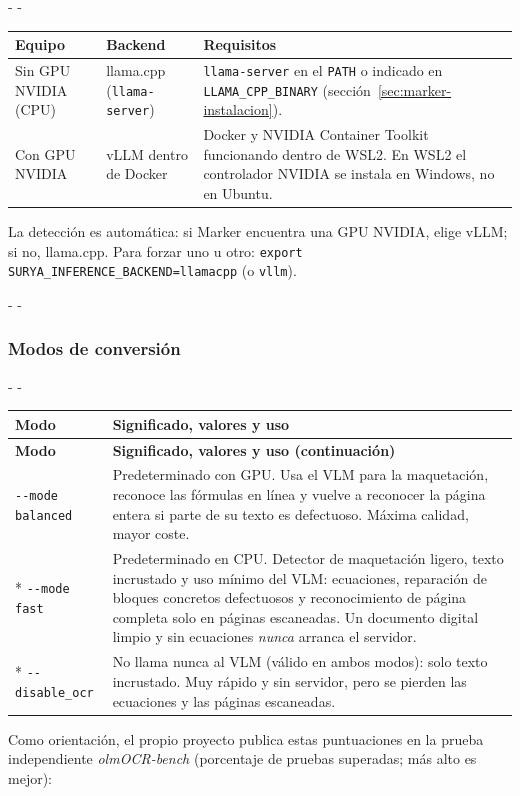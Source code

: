\documentclass[11pt,a4paper]{article}
\makeatletter
\newcommand{\necesitaespacio}[1]{\par\penalty-100\begingroup
	\setlength{\dimen@}{#1}\dimen@ii\pagegoal\advance\dimen@ii-\pagetotal
	\ifdim\dimen@>\dimen@ii\ifdim\dimen@ii>\z@\vfil\fi\penalty-\@M\fi\endgroup}
\newenvironment{opciones}[1][Opción]{%
	\par\begingroup\small
	\begin{longtable}{L{4.25cm}L{11.2cm}}
		\toprule\rowcolor{tablacab}\cab{#1} & \cab{Significado, valores y uso} \\ \midrule
		\endfirsthead
		\toprule\rowcolor{tablacab}\cab{#1} & \cab{Significado, valores y uso (continuación)} \\ \midrule
		\endhead
		\bottomrule
		\endfoot}
	{\end{longtable}\endgroup}
\newcommand{\cmd}[1]{\texttt{\textcolor{colcmd}{#1}}}      %
\newcommand{\opt}[1]{\texttt{\textcolor{colopt}{#1}}}      %
\newcommand{\val}[1]{\texttt{#1}}                          %
\newcommand{\cab}[1]{\textbf{#1}}
\makeatother
\begin{document}
	\begingroup\small
	\necesitaespacio{14\baselineskip}
	\begin{longtable}{L{3.3cm}L{5.4cm}L{6.36cm}}
		\toprule{}\cab{Equipo} & \cab{Backend} & \cab{Requisitos}\\\midrule
		\endfirsthead
		\bottomrule
		\endfoot
		Sin GPU NVIDIA (CPU) & llama.cpp (\cmd{llama-server}) & \cmd{llama-server} en el \texttt{PATH} o indicado en \texttt{LLAMA\_\allowbreak{}CPP\_\allowbreak{}BINARY} (sección~\ref{sec:marker-instalacion}).\\
		Con GPU NVIDIA & vLLM dentro de Docker & Docker y NVIDIA Container Toolkit funcionando dentro de WSL2. En WSL2 el controlador NVIDIA se instala en Windows, no en Ubuntu.\\
	\end{longtable}
	\endgroup
	
	La detección es automática: si Marker encuentra una GPU NVIDIA, elige vLLM; si no, llama.cpp. Para forzar uno u otro: \texttt{export SURYA\_\allowbreak{}INFERENCE\_\allowbreak{}BACKEND=\allowbreak{}llamacpp} (o \val{vllm}).
	
	\necesitaespacio{25\baselineskip}
	\subsubsection{Modos de conversión}\label{sec:marker-modos}
	
	\necesitaespacio{21\baselineskip}
	\begin{opciones}[Modo]
		\opt{-{}-mode balanced} & Predeterminado con GPU. Usa el VLM para la maquetación, reconoce las fórmulas en línea y vuelve a reconocer la página entera si parte de su texto es defectuoso. Máxima calidad, mayor coste.\\*
		\opt{-{}-mode fast} & Predeterminado en CPU. Detector de maquetación ligero, texto incrustado y uso mínimo del VLM: ecuaciones, reparación de bloques concretos defectuosos y reconocimiento de página completa solo en páginas escaneadas. Un documento digital limpio y sin ecuaciones \emph{nunca} arranca el servidor.\\*
		\opt{-{}-disable\_ocr} & No llama nunca al VLM (válido en ambos modos): solo texto incrustado. Muy rápido y sin servidor, pero se pierden las ecuaciones y las páginas escaneadas.\\
	\end{opciones}
	
	Como orientación, el propio proyecto publica estas puntuaciones en la prueba independiente \emph{olmOCR-bench} (porcentaje de pruebas superadas; más alto es mejor):
	
\end{document}
